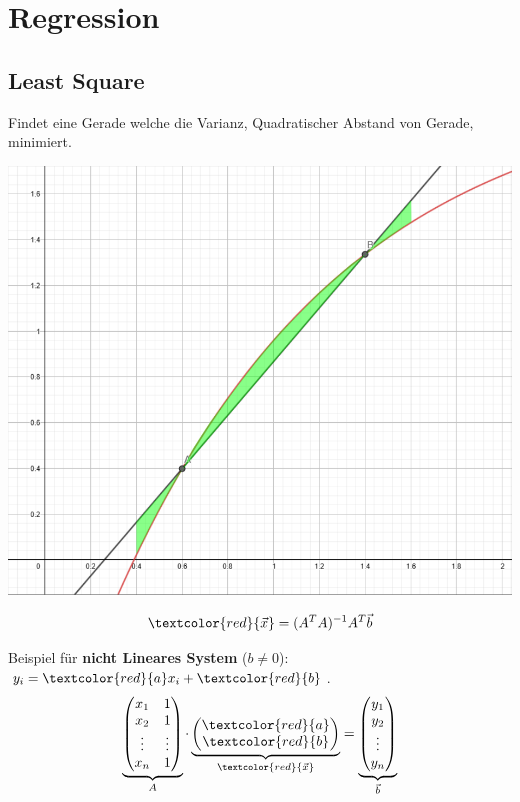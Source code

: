 \section{Regression}
\subsection{Least Square}
Findet eine Gerade welche die Varianz, Quadratischer Abstand von Gerade, minimiert. 
\begin{center}
	\begin{minipage}{0.20\textwidth}
		\begin{center}
			\includegraphics[width=\linewidth,keepaspectratio=true]{Images/leastsquare}\\
		\end{center}
	\end{minipage}%
	\begin{minipage}{0.3\textwidth}
		\[\textcolor{red}{\vec{x}} = (A^TA)^{-1}A^T\vec{b}\]
	\end{minipage}
\end{center}

\noindent
Beispiel für \textbf{nicht Lineares System} ($b\neq0$): $y_i = \textcolor{red}{a}x_i + \textcolor{red}{b}$.
\[
\underbrace{\begin{pmatrix}
		x_1 & 1 \\
		x_2 & 1 \\
		\vdots & \vdots \\
		x_n & 1
\end{pmatrix}}_{\scriptsize{A}}
\cdot
\underbrace{\begin{pmatrix}
		\textcolor{red}{a} \\
		\textcolor{red}{b}
\end{pmatrix}}_{\scriptsize{\textcolor{red}{\vec{x}}}}
=
\underbrace{\begin{pmatrix}
		y_1 \\
		y_2 \\
		\vdots \\
		y_n
\end{pmatrix}}_{\scriptsize{\vec{b}}}
\]

